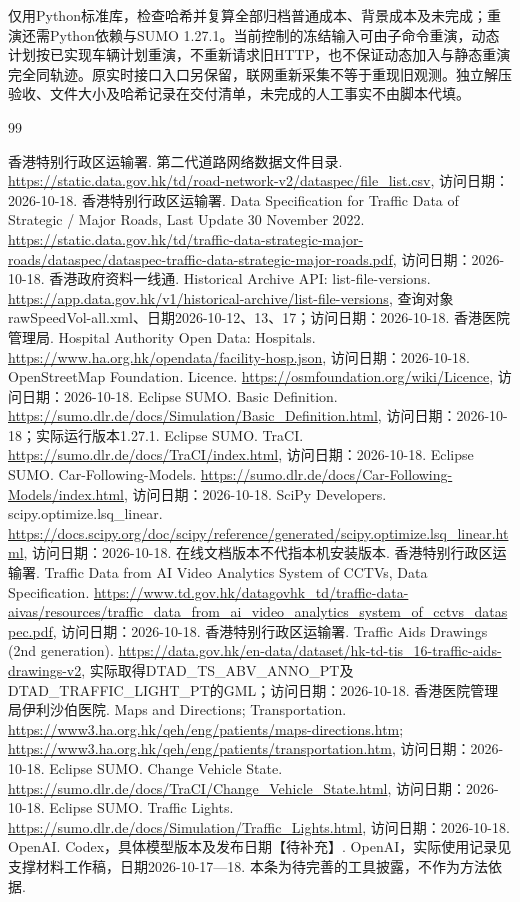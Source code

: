 \documentclass[UTF8,fontset=windows,zihao=-4,a4paper]{ctexart}
\newcommand{\file}[1]{\texttt{\detokenize{#1}}}
\begin{document}
\file{python reproduce.py verify --output checks}仅用Python标准库，检查哈希并复算全部归档普通成本、背景成本及未完成；重演还需Python依赖与SUMO 1.27.1。当前控制的冻结输入可由\file{run}子命令重演，动态计划按已实现车辆计划重演，不重新请求旧HTTP，也不保证动态加入与静态重演完全同轨迹。原实时接口入口另保留，联网重新采集不等于重现旧观测。独立解压验收、文件大小及哈希记录在交付清单，未完成的人工事实不由脚本代填。
\begin{thebibliography}{99}
\raggedright
{} 香港特别行政区运输署. 第二代道路网络数据文件目录. \url{https://static.data.gov.hk/td/road-network-v2/dataspec/file_list.csv}, 访问日期：2026-10-18.
 香港特别行政区运输署. Data Specification for Traffic Data of Strategic / Major Roads, Last Update 30 November 2022. \url{https://static.data.gov.hk/td/traffic-data-strategic-major-roads/dataspec/dataspec-traffic-data-strategic-major-roads.pdf}, 访问日期：2026-10-18.
 香港政府资料一线通. Historical Archive API: list-file-versions. \url{https://app.data.gov.hk/v1/historical-archive/list-file-versions}, 查询对象rawSpeedVol-all.xml、日期2026-10-12、13、17；访问日期：2026-10-18.
 香港医院管理局. Hospital Authority Open Data: Hospitals. \url{https://www.ha.org.hk/opendata/facility-hosp.json}, 访问日期：2026-10-18.
 OpenStreetMap Foundation. Licence. \url{https://osmfoundation.org/wiki/Licence}, 访问日期：2026-10-18.
 Eclipse SUMO. Basic Definition. \url{https://sumo.dlr.de/docs/Simulation/Basic_Definition.html}, 访问日期：2026-10-18；实际运行版本1.27.1.
 Eclipse SUMO. TraCI. \url{https://sumo.dlr.de/docs/TraCI/index.html}, 访问日期：2026-10-18.
 Eclipse SUMO. Car-Following-Models. \url{https://sumo.dlr.de/docs/Car-Following-Models/index.html}, 访问日期：2026-10-18.
 SciPy Developers. scipy.optimize.lsq\_linear. \url{https://docs.scipy.org/doc/scipy/reference/generated/scipy.optimize.lsq_linear.html}, 访问日期：2026-10-18. 在线文档版本不代指本机安装版本.
 香港特别行政区运输署. Traffic Data from AI Video Analytics System of CCTVs, Data Specification. \url{https://www.td.gov.hk/datagovhk_td/traffic-data-aivas/resources/traffic_data_from_ai_video_analytics_system_of_cctvs_dataspec.pdf}, 访问日期：2026-10-18.
 香港特别行政区运输署. Traffic Aids Drawings (2nd generation). \url{https://data.gov.hk/en-data/dataset/hk-td-tis_16-traffic-aids-drawings-v2}, 实际取得DTAD\_TS\_ABV\_ANNO\_PT及DTAD\_TRAFFIC\_LIGHT\_PT的GML；访问日期：2026-10-18.
 香港医院管理局伊利沙伯医院. Maps and Directions; Transportation. \url{https://www3.ha.org.hk/qeh/eng/patients/maps-directions.htm}; \url{https://www3.ha.org.hk/qeh/eng/patients/transportation.htm}, 访问日期：2026-10-18.
 Eclipse SUMO. Change Vehicle State. \url{https://sumo.dlr.de/docs/TraCI/Change_Vehicle_State.html}, 访问日期：2026-10-18.
 Eclipse SUMO. Traffic Lights. \url{https://sumo.dlr.de/docs/Simulation/Traffic_Lights.html}, 访问日期：2026-10-18.
 OpenAI. Codex，具体模型版本及发布日期【待补充】. OpenAI，实际使用记录见支撑材料工作稿，日期2026-10-17—18. 本条为待完善的工具披露，不作为方法依据.
\end{thebibliography}
\end{document}
